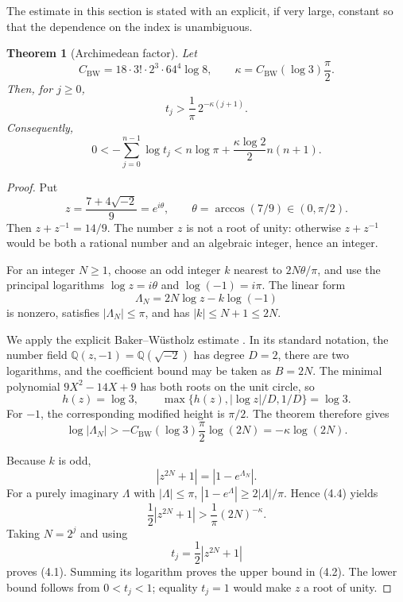 \documentclass[11pt]{article}
\newtheorem{theorem}{Theorem}
\theoremstyle{remark}
\newcommand{\QQ}{\mathbb{Q}}
\begin{document}
The estimate in this section is stated with an explicit, if very large,
constant so that the dependence on the index is unambiguous.

\begin{theorem}[Archimedean factor]\label{thm:baker}
Let
\[
 C_{\mathrm{BW}}
 =18\cdot3!\cdot2^3\cdot64^4\log 8,
 \qquad
 \kappa=C_{\mathrm{BW}}(\log3)\frac{\pi}{2}.
\]
Then, for \(j\geq0\),
\[
 t_j>\frac1\pi\,2^{-\kappa(j+1)}.                          \tag{4.1}
\]
Consequently,
\[
 0<-\sum_{j=0}^{n-1}\log t_j
 <n\log\pi+\frac{\kappa\log2}{2}n(n+1).                   \tag{4.2}
\]
\end{theorem}

\begin{proof}
Put
\[
 z=\frac{7+4\sqrt{-2}}9=e^{i\theta},
 \qquad \theta=\arccos(7/9)\in(0,\pi/2).
\]
Then \(z+z^{-1}=14/9\).  The number \(z\) is not a root of unity:
otherwise \(z+z^{-1}\) would be both a rational number and an algebraic
integer, hence an integer.

For an integer \(N\geq1\), choose an odd integer \(k\) nearest to
\(2N\theta/\pi\), and use the principal logarithms
\(\log z=i\theta\) and \(\log(-1)=i\pi\).  The linear form
\[
 \Lambda_N=2N\log z-k\log(-1)                              \tag{4.3}
\]
is nonzero, satisfies \(|\Lambda_N|\leq\pi\), and has
\(|k|\leq N+1\leq2N\).

We apply the explicit Baker--Wüstholz estimate
\cite[Theorem~1]{BakerWustholz1993}.  In its standard notation, the number
field \(\QQ(z,-1)=\QQ(\sqrt{-2})\) has degree \(D=2\), there are two
logarithms, and the coefficient bound may be taken as \(B=2N\).  The
minimal polynomial \(9X^2-14X+9\) has both roots on the unit circle, so
\[
 h(z)=\log3,\qquad
 \max\{h(z),|\log z|/D,1/D\}=\log3.
\]
For \(-1\), the corresponding modified height is \(\pi/2\).  The theorem
therefore gives
\[
 \log|\Lambda_N|>
 -C_{\mathrm{BW}}(\log3)\frac{\pi}{2}\log(2N)
 =-\kappa\log(2N).                                        \tag{4.4}
\]

Because \(k\) is odd,
\[
 |z^{2N}+1|=|1-e^{\Lambda_N}|.
\]
For a purely imaginary \(\Lambda\) with \(|\Lambda|\leq\pi\),
\(|1-e^\Lambda|\geq2|\Lambda|/\pi\).  Hence (4.4) yields
\[
 \frac12|z^{2N}+1|>\frac1\pi(2N)^{-\kappa}.                \tag{4.5}
\]
Taking \(N=2^j\) and using
\[
 t_j=\frac12|z^{2N}+1|
\]
proves (4.1).  Summing its logarithm proves the upper bound in (4.2).
The lower bound follows from \(0<t_j<1\); equality \(t_j=1\) would make
\(z\) a root of unity.
\end{proof}
\end{document}
